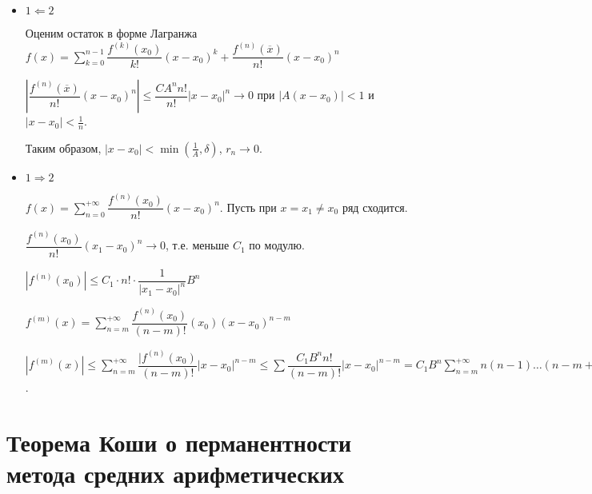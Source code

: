 \documentclass{article}
\begin{document}
            \begin{itemize}
            
                \item $1 \Leftarrow 2$
                
                    Оценим остаток в форме Лагранжа $f(x) = \sum\limits^{n - 1}_{k = 0} \dfrac{f^{(k)}(x_0)}{k!} (x - x_0)^k + \dfrac{f^{(n)}(\overline{x})}{n!} (x - x_0)^n$
                    
                    $\left| \dfrac{f^{(n)}(\overline{x})}{n!} (x - x_0)^n \right| \leq \dfrac{C A^n n!}{n!} |x - x_0|^n \rightarrow 0$ при $|A(x - x_0)| < 1$ и $|x - x_0| < \frac{1}{n}$. 
                    
                    Таким образом, $|x - x_0| < \min \left( \frac{1}{A}, \delta \right)$, $r_n \rightarrow 0$.
                    
                \item $1 \Rightarrow 2$
                
                    $f(x) = \sum\limits^{+\infty}_{n = 0} \dfrac{f^{(n)}(x_0)}{n!} (x - x_0)^n$. Пусть при $x = x_1 \neq x_0$ ряд сходится.
                    
                    $\dfrac{f^{(n)}(x_0)}{n!} (x_1 - x_0)^n \rightarrow 0$, т.е. меньше $C_1$ по модулю.
                    
                    $\left| f^{(n)}(x_0) \right| \leq C_1 \cdot n! \cdot \dfrac{1}{| x_1 - x_0 |^n} B^n$
                    
                    $f^{(m)}(x) = \sum\limits^{+\infty}_{n = m} \dfrac{f^{(n)}(x_0)}{(n - m)!} (x_0) (x - x_0)^{n - m}$
                    
                    $\left| f^{(m)}(x) \right| \leq \sum\limits^{+\infty}_{n = m} \dfrac{|f^{(n)}(x_0)}{(n - m)!} |x - x_0|^{n - m} \leq \sum \dfrac{C_1 B^n n!}{(n - m)!} |x - x_0|^{n - m} = C_1 B^n \sum\limits^{+\infty}_{n = m} n (n - 1) \ldots (n - m + 1) \left| B(x - x_0) \right|^{n - m} = C_1 \cdot \dfrac{m! B^m}{| 1 - \left( B(x - x_0) \right)}^{(m + 1)} \leq C_1 m! B^m 2^{m + 1} = (2 C_1) m! (2 B)^m$.
                    
            \end{itemize}
            
    \newpage
    
    \section{Теорема Коши о перманентности метода средних арифметических}
        
\end{document}
